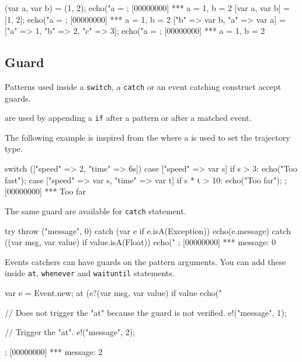 \begin{urbiscript}
{
  (var a, var b) = (1, 2);
  echo("a = %
};
[00000000] *** a = 1, b = 2
{
  [var a, var b] = [1, 2];
  echo("a = %
};
[00000000] *** a = 1, b = 2
{
  ["b" => var b, "a" => var a] = ["a" => 1, "b" => 2, "c" => 3];
  echo("a = %
};
[00000000] *** a = 1, b = 2
\end{urbiscript}

\subsection{Guard}

Patterns used inside a \lstinline{switch}, a \lstinline{catch} or an event
catching construct accept guards.

 are used by appending a \lstinline{if} after a pattern or
after a matched event.

The following example is inspired from the 
where a  is used to set the trajectory type.

\begin{urbiscript}
switch (["speed" => 2, "time" => 6s])
{
  case ["speed" => var s] if s > 3:
    echo("Too fast");
  case ["speed" => var s, "time" => var t] if s * t > 10:
    echo("Too far");
};
[00000000] *** Too far
\end{urbiscript}

The same guard are available for \lstinline{catch} statement.

\begin{urbiscript}
try
{
  throw ("message", 0)
}
catch (var e if e.isA(Exception))
{
  echo(e.message)
}
catch ((var msg, var value) if value.isA(Float))
{
  echo("%
};
[00000000] *** message: 0
\end{urbiscript}

Events catchers can have guards on the pattern arguments.  You can add these
inside \lstinline{at}, \lstinline{whenever} and \lstinline{waituntil}
statements.

\begin{urbiscript}
{
  var e = Event.new;
  at (e?(var msg, var value) if value %
    echo("%

  // Does not trigger the "at" because the guard is not verified.
  e!("message", 1);

  // Trigger the "at".
  e!("message", 2);
};
[00000000] *** message: 2
\end{urbiscript}

